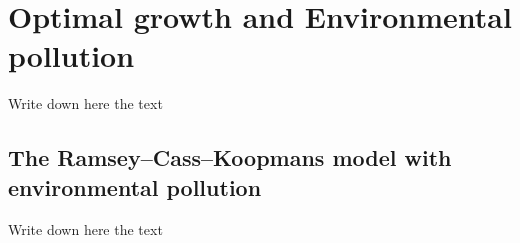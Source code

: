\section{Optimal growth and Environmental pollution}\label{Sec:opt-grow-env-poll}
Write down here the text
\subsection{The Ramsey–Cass–Koopmans model with environmental pollution}
Write down here the text
